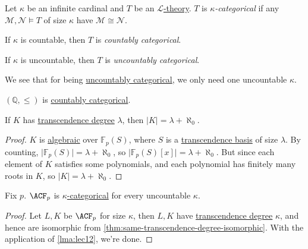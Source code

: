\begin{definition}[Categorical]\label{def:categorical}
	Let \(\kappa \) be an infinite cardinal and \(T\) be an \hyperref[def:theory]{\(\mathcal{L} \)-theory}. \(T\) is \emph{\(\kappa \)-categorical} if any \(\mathcal{M} , \mathcal{N} \models T\) of size \(\kappa \) have \(\mathcal{M} \cong \mathcal{N} \).

	\begin{definition}\label{def:countably-categorical}
		If \(\kappa \) is countable, then \(T\) is \emph{countably categorical}.
	\end{definition}
	\begin{definition}\label{def:uncountably-categorical}
		If \(\kappa \) is uncountable, then \(T\) is \emph{uncountably categorical}.
	\end{definition}
\end{definition}

We see that for being \hyperref[def:uncountably-categorical]{uncountably categorical}, we only need one uncountable \(\kappa \).

\begin{eg}
	\((\mathbb{Q} , \leq )\) is \hyperref[def:countably-categorical]{countably categorical}.
\end{eg}

\begin{lemma}\label{lma:lec12}
	If \(K\) has \hyperref[def:transcendence-degree]{transcendence degree} \(\lambda \), then \(\vert K \vert = \lambda + \aleph_0\).
\end{lemma}
\begin{proof}
	\(K\) is \hyperref[def:algebraic]{algebraic} over \(\mathbb{F} _p(S)\), where \(S\) is a \hyperref[def:transcendence-basis]{transcendence basis} of size \(\lambda \). By counting, \(\vert \mathbb{F} _p(S) \vert = \lambda + \aleph_0\), so \(\vert \mathbb{F} _p(S)[x] \vert = \lambda + \aleph_0\). But since each element of \(K\) satisfies some polynomials, and each polynomial has finitely many roots in \(K\), so \(\vert K \vert = \lambda +\aleph_0\).
\end{proof}

\begin{theorem}
	Fix \(p\). \(\ACF_p \) is \hyperref[def:categorical]{\(\kappa \)-categorical} for every uncountable \(\kappa \).
\end{theorem}
\begin{proof}
	Let \(L, K\) be \(\ACF_p \) for size \(\kappa \), then \(L, K\) have \hyperref[def:transcendence-degree]{transcendence degree} \(\kappa \), and hence are isomorphic from \autoref{thm:same-transcendence-degree-isomorphic}. With the application of \autoref{lma:lec12}, we're done.
\end{proof}

